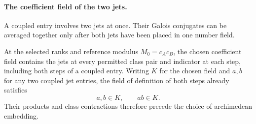 \paragraph{The coefficient field of the two jets.}

A coupled entry involves two jets at once. Their Galois conjugates can be averaged together only after both jets have been placed in one number field.

\begin{lemma}\label{lem:coupled-jets-field}
At the selected ranks and reference modulus \(M_0=c_Ac_B\),
the chosen coefficient field contains the jets at every permitted
class pair and indicator at each step, including both steps of a
coupled entry. Writing \(K\) for the chosen field and \(a,b\) for any two coupled jet entries, the field of definition of both steps already satisfies
\[
 a,b\in K,\qquad ab\in K.
\]
Their products and class contractions therefore precede the choice of archimedean embedding.
\end{lemma}

